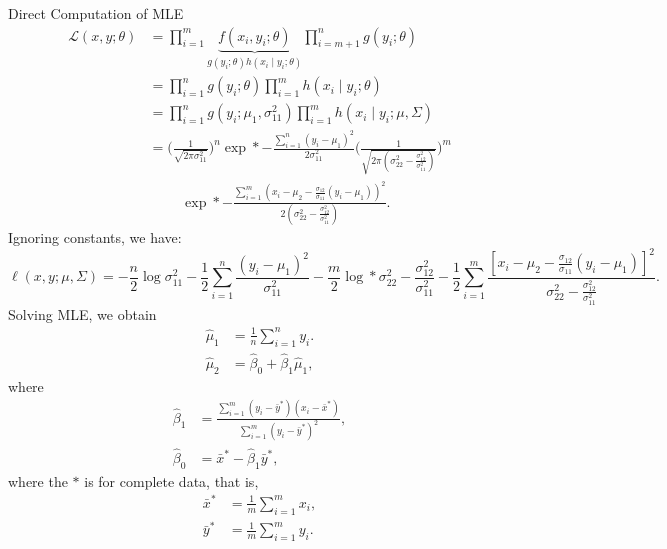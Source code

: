 \begin{Example}{Direct Computation of MLE}
    \begin{align*}
        \mathcal{L}(x,y;\theta)
         & =\prod_{i=1}^m \underbrace{f(x_i,y_i;\theta)}_{g(y_i;\theta)h(x_i\mid y_i;\theta)}
        \prod_{i=m+1}^{n}g(y_i;\theta)                                                               \\
         & =\prod_{i=1}^n g(y_i;\theta)\prod_{i=1}^{m}h(x_i\mid y_i;\theta)                          \\
         & =\prod_{i=1}^n g(y_i;\mu_1,\sigma_{11}^2)
        \prod_{i=1}^m h(x_i\mid y_i;\mu,\Sigma)                                                      \\
         & =\biggl(\frac{1}{\sqrt{2\pi\sigma_{11}^2}}\biggr)^{\!n}
        \exp*{-\frac{\sum_{i=1}^{n}(y_i-\mu_1)^2}{2\sigma_{11}^2}}
        \Biggl(\frac{1}{\sqrt{2\pi(\sigma_{22}^2-\frac{\sigma_{12}^2}{\sigma_{11}^2})}}\Biggr)^{\!m} \\
         & \phantom{{}={}}\quad
        \exp*{-\frac{\sum_{i=1}^{m}(x_i-\mu_2-\frac{\sigma_{12}}{\sigma_{11}}(y_i-\mu_1))^2}{2(\sigma_{22}^2-\frac{\sigma_{12}^2}{\sigma_{11}^2})}}.
    \end{align*}
    Ignoring constants, we have:
    \begin{equation}\label{obslik}\tag*{(3)}
        \ell(x,y;\mu,\Sigma)
        =-\frac{n}{2}\log{\sigma_{11}^2}-\frac{1}{2}\sum_{i=1}^{n}\frac{(y_i-\mu_1)^2}{\sigma_{11}^2}
        -\frac{m}{2}\log*{\sigma_{22}^2-\frac{\sigma_{12}^2}{\sigma_{11}^2}}
        -\frac{1}{2}\sum_{i=1}^{m}\frac{[x_i-\mu_2-\frac{\sigma_{12}}{\sigma_{11}}(y_i-\mu_1)]^2}{\sigma_{22}^2-\frac{\sigma_{12}^2}{\sigma_{11}^2}}.
    \end{equation}
    Solving MLE, we obtain
    \begin{align*}
        \hat{\mu}_1 & =\frac{1}{n}\sum_{i=1}^{n}y_i.           \\
        \hat{\mu}_2 & =\hat{\beta}_0+\hat{\beta}_1\hat{\mu}_1,
    \end{align*}
    where
    \begin{align*}
        \hat{\beta}_1 & =\frac{\sum_{i=1}^{m}(y_i-\bar{y}^*)(x_i-\bar{x}^*)}{
        \sum_{i=1}^{m}(y_i-\bar{y}^*)^2},                                     \\
        \hat{\beta}_0 & =\bar{x}^*-\hat{\beta}_1\bar{y}^*,
    \end{align*}
    where the $*$ is for complete data, that is,
    \begin{align*}
        \bar{x}^* & =\frac{1}{m}\sum_{i=1}^{m}x_i, \\
        \bar{y}^* & =\frac{1}{m}\sum_{i=1}^{m}y_i.
    \end{align*}
\end{Example}

